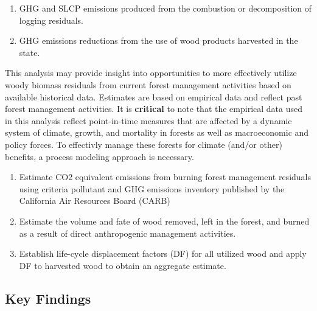 \documentclass[a4paper]{article}
\begin{document}
\begin{enumerate}
\item GHG and SLCP emissions produced from the combustion or
decomposition of logging residuals.
\item GHG emissions reductions from the use of wood products harvested in
the state.
\end{enumerate}

This analysis may provide insight into
opportunities to more effectively utilize woody biomass residuals from
current forest management activities based on available historical
data. Estimates are based on empirical data and reflect past forest
management activities. It is \textbf{critical} to note that the empirical
data used in this analysis reflect point-in-time measures that are
affected by a dynamic system of climate, growth, and mortality in
forests as well as macroeconomic and policy forces. To effectivly
manage these forests for climate (and/or other) benefits, a process modeling
approach is necessary. 

\begin{enumerate}
\item Estimate CO2 equivalent emissions from burning forest management
residuals using criteria pollutant and GHG emissions inventory
published by the California Air Resources Board (CARB)

\item Estimate the volume and fate of wood removed, left in the
forest, and burned as a result of direct anthropogenic management
activities.

\item Establish life-cycle displacement factors (DF) for all
utilized wood and apply DF to harvested wood to obtain an aggregate estimate.
\end{enumerate}

\subsection{Key Findings}
\label{sec-1-1}
\end{document}
